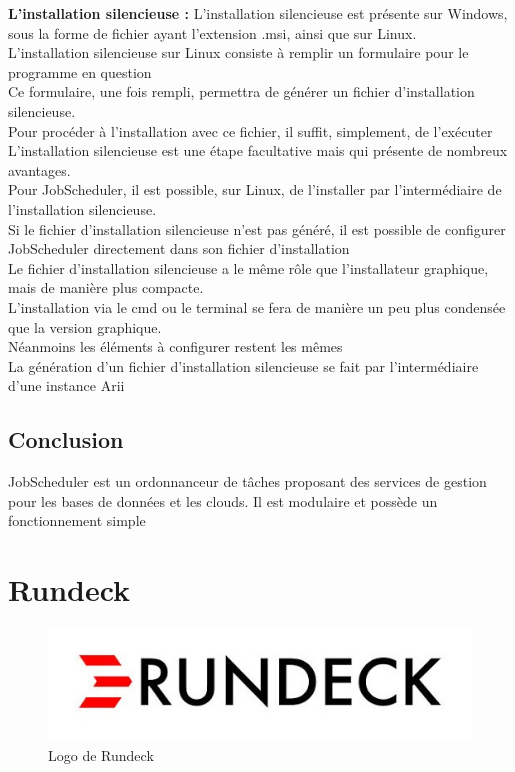 \documentclass[12pt]{article}
\begin{document}
\vspace{0.5cm}
\textbf{L'installation silencieuse :}
L'installation silencieuse est présente sur Windows, sous la forme de fichier ayant l'extension .msi, ainsi que sur Linux.
\\
L'installation silencieuse sur Linux consiste à remplir un formulaire pour le programme en question
\\
Ce formulaire, une fois rempli, permettra de générer un fichier d'installation silencieuse.
\\
Pour procéder à l'installation avec ce fichier, il suffit, simplement, de l'exécuter
\\
L'installation silencieuse est une étape facultative mais qui présente de nombreux avantages.
\\
Pour JobScheduler, il est possible, sur Linux, de l'installer par l'intermédiaire de l'installation silencieuse.
\\
Si le fichier d'installation silencieuse n'est pas généré, il est possible de configurer JobScheduler directement dans son fichier d'installation
\\
Le fichier d'installation silencieuse a le même rôle que l'installateur graphique, mais de manière plus compacte.
\\
L'installation via le cmd ou le terminal se fera de manière un peu plus condensée que la version graphique.
\\
Néanmoins les éléments à configurer restent les mêmes
\\
La génération d'un fichier d'installation silencieuse se fait par l'intermédiaire d'une instance Arii

\subsection{Conclusion}
JobScheduler est un ordonnanceur de tâches proposant des services de gestion pour les bases de données et les clouds. Il est modulaire et possède un fonctionnement simple


\section{Rundeck}

\begin{figure}[ht]
    \includegraphics[scale=0.8]{images/rundeck.jpg}
    \caption{Logo de Rundeck}
\end{figure}
\end{document}
